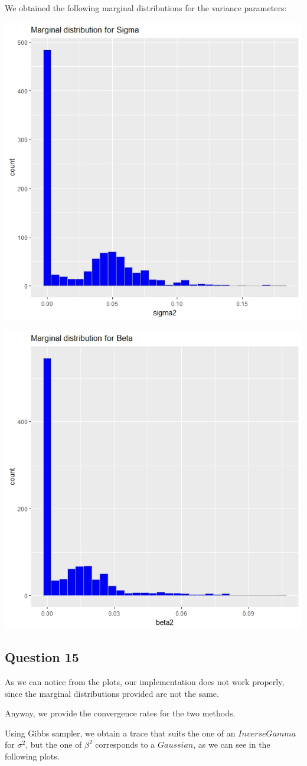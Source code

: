 \documentclass[]{article}
\begin{document}
	
	We obtained the following marginal distributions for the variance parameters:
	
	\begin{center}
		
		\includegraphics[width=.4\textwidth]{task5/CSMC_sigma2.jpeg}
		
		\includegraphics[width=.4\textwidth]{task5/CSMC_beta2.jpeg}
		
	\end{center}
	
	
	\subsection*{Question 15}
	
	As we can notice from the plots, our implementation does not work properly, since the marginal distributions provided are not the same. 
	
	
	Anyway, we provide the convergence rates for the two methods.
	
	
	Using Gibbs sampler, we obtain a trace that suits the one of an $Inverse Gamma$ for $\sigma^2$, but the one of $\beta^2$ corresponds to a $Gaussian$, as we can see in the following plots.
	
\end{document}
